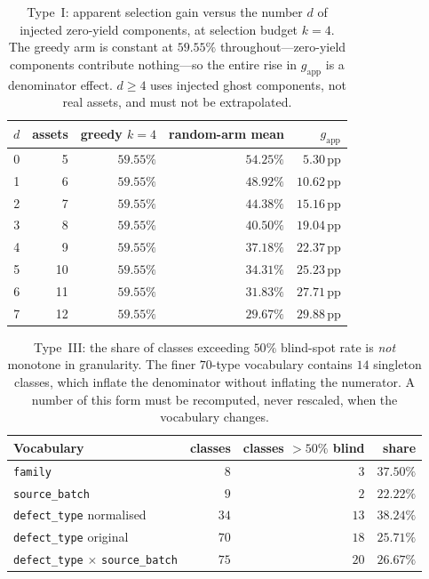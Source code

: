 \documentclass{article}
\newcommand{\pp}{\,\mathrm{pp}}
\begin{document}
\begin{table}[h]
\centering
\small
\caption{Type~I: apparent selection gain versus the number $d$ of injected zero-yield components, at
selection budget $k=4$. The greedy arm is constant at $59.55\%$ throughout---zero-yield components
contribute nothing---so the entire rise in $g_{\text{app}}$ is a denominator effect. $d\ge4$ uses injected
ghost components, not real assets, and must not be extrapolated.}
\label{tab:gapp}
\begin{tabular}{@{}rrrrr@{}}
\toprule
$d$ & assets & greedy $k{=}4$ & random-arm mean & $g_{\text{app}}$ \\
\midrule
0 & 5 & $59.55\%$ & $54.25\%$ & $5.30\pp$ \\
1 & 6 & $59.55\%$ & $48.92\%$ & $10.62\pp$ \\
2 & 7 & $59.55\%$ & $44.38\%$ & $15.16\pp$ \\
3 & 8 & $59.55\%$ & $40.50\%$ & $19.04\pp$ \\
4 & 9 & $59.55\%$ & $37.18\%$ & $22.37\pp$ \\
5 & 10 & $59.55\%$ & $34.31\%$ & $25.23\pp$ \\
6 & 11 & $59.55\%$ & $31.83\%$ & $27.71\pp$ \\
7 & 12 & $59.55\%$ & $29.67\%$ & $29.88\pp$ \\
\bottomrule
\end{tabular}
\end{table}

\begin{table}[h]
\centering
\small
\caption{Type~III: the share of classes exceeding $50\%$ blind-spot rate is \emph{not} monotone in
granularity. The finer $70$-type vocabulary contains $14$ singleton classes, which inflate the denominator
without inflating the numerator. A number of this form must be recomputed, never rescaled, when the
vocabulary changes.}
\label{tab:granularity}
\begin{tabular}{@{}p{5.6cm} r r r@{}}
\toprule
Vocabulary & classes & classes $>50\%$ blind & share \\
\midrule
\texttt{family} & $8$ & $3$ & $37.50\%$ \\
\texttt{source\_batch} & $9$ & $2$ & $22.22\%$ \\
\texttt{defect\_type} normalised & $34$ & $13$ & $38.24\%$ \\
\texttt{defect\_type} original & $70$ & $18$ & $25.71\%$ \\
\texttt{defect\_type} $\times$ \texttt{source\_batch} & $75$ & $20$ & $26.67\%$ \\
\bottomrule
\end{tabular}
\end{table}
\end{document}
